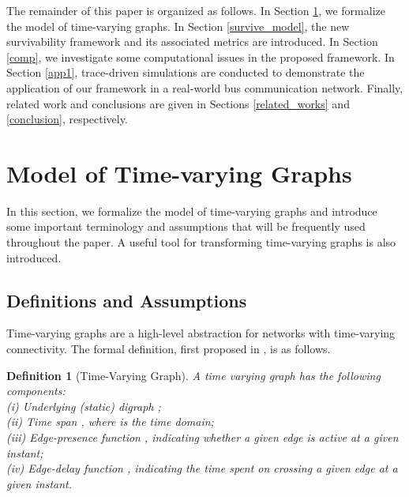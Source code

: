 \documentclass[10pt, conference, letterpaper]{IEEEtran}
\newtheorem{definition}{Definition}
\begin{document}


The remainder of this paper is organized as follows. In Section \ref{graph_model}, we formalize the model of time-varying graphs. In Section \ref{survive_model}, the new survivability framework and its associated metrics are introduced. In Section \ref{comp}, we investigate some computational issues in the proposed framework. In Section \ref{app1}, trace-driven simulations are conducted to demonstrate the application of our framework in a real-world bus communication network. Finally, related work and conclusions are given in Sections \ref{related_works} and \ref{conclusion}, respectively.
\section{Model of Time-varying Graphs}\label{graph_model}
In this section, we formalize the model of time-varying graphs and introduce some important terminology and assumptions that will be frequently used throughout the paper. A useful tool for transforming time-varying graphs is also introduced.
\subsection{Definitions and Assumptions}\label{def}
Time-varying graphs are a high-level abstraction for networks with time-varying connectivity. The formal definition, first proposed in \cite{TVG2}, is as follows.

\begin{definition}[{Time-Varying Graph}]\label{def_time}
A time varying graph  has the following components: \\
(i) Underlying (static) digraph ;\\
(ii) Time span , where  is the time domain;\\
(iii) Edge-presence function , indicating whether a given edge is active at a given instant; \\
(iv)  Edge-delay function , indicating the time spent on crossing a given edge at
a given instant.
\end{definition}
\end{document}

